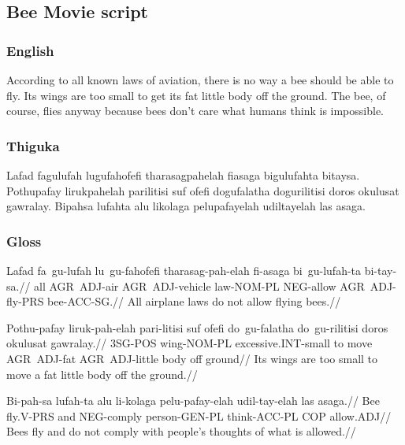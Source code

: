 \newpage

\subsection{Bee Movie script}

\subsubsection*{English}
According to all known laws of aviation, there is no way a bee should be able to fly.
Its wings are too small to get its fat little body off the ground.
The bee, of course, flies anyway because bees don't care what humans think is impossible.

\subsubsection*{Thiguka}
Lafad fagulufah lugufahofefi tharasagpahelah fiasaga bigulufahta bitaysa.
Pothupafay lirukpahelah parilitisi suf ofefi dogufalatha dogurilitisi doros okulusat gawralay.
Bipahsa lufahta alu likolaga pelupafayelah udiltayelah las asaga.

\subsubsection*{Gloss}
\ex
\begingl
\gla  Lafad fa~gu-lufah lu~gu-fahofefi tharasag-pah-elah fi-asaga bi~gu-lufah-ta bi-tay-sa.//
\glb  all AGR~ADJ-air AGR~ADJ-vehicle law-NOM-PL NEG-allow AGR~ADJ-fly-PRS bee-ACC-SG.//
\glft All airplane laws do not allow flying bees.//
\endgl
\xe

\ex
\begingl
\gla  Pothu-pafay liruk-pah-elah  pari-litisi suf ofefi  do~gu-falatha do~gu-rilitisi doros okulusat gawralay.//
\glb  3SG-POS wing-NOM-PL  excessive.INT-small to move  AGR~ADJ-fat AGR~ADJ-little body off ground//
\glft Its wings are too small to move a fat little body off the ground.//
\endgl
\xe

\ex
\begingl
\gla  Bi-pah-sa lufah-ta alu li-kolaga pelu-pafay-elah udil-tay-elah las asaga.//
\glb  Bee fly.V-PRS and NEG-comply person-GEN-PL think-ACC-PL COP allow.ADJ//
\glft Bees fly and do not comply with people's thoughts of what is allowed.//
\endgl
\xe


